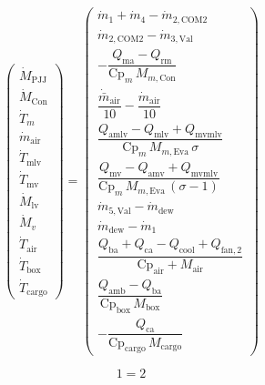 \begin{equation} \renewcommand{\arraystretch}{2.5}
	\left(\begin{array}{c}
		{\dot{M} }_{\textrm{PJJ}} \\
		{\dot{M} }_{\textrm{Con}} \\
		{\dot{T} }_m \\
		{\dot{m} }_{\textrm{air}} \\
		{\dot{T} }_{\textrm{mlv}} \\
		{\dot{T} }_{\textrm{mv}} \\
		{\dot{M} }_{\textrm{lv}} \\
		{\dot{M} }_v \\
		{\dot{T} }_{\textrm{air}} \\
		{\dot{T} }_{\textrm{box}} \\
		{\dot{T} }_{\textrm{cargo}}
	\end{array}\right)
	=
	\left(\begin{array}{c}
		{\dot{m} }_1 +{\dot{m} }_4 -{\dot{m} }_{2,\textrm{COM2}} \\
		{\dot{m} }_{2,\textrm{COM2}} -{\dot{m} }_{3,\textrm{Val}} \\
		-\dfrac{Q_{\textrm{ma}} -Q_{\textrm{rm}} }{{\textrm{Cp}}_m \,M_{m,\textrm{Con}} }\\
		\dfrac{{\dot{\bar{m} } }_{\textrm{air}} }{10}-\dfrac{{\dot{m} }_{\textrm{air}} }{10}\\
		\dfrac{Q_{\textrm{amlv}} -Q_{\textrm{mlv}} +Q_{\textrm{mvmlv}} }{{\textrm{Cp}}_m \,M_{m,\textrm{Eva}} \,\sigma }\\
		\dfrac{Q_{\textrm{mv}} -Q_{\textrm{amv}} +Q_{\textrm{mvmlv}} }{{\textrm{Cp}}_m \,M_{m,\textrm{Eva}} \,{\left(\sigma -1\right)}}\\
		{\dot{m} }_{5,\textrm{Val}} -{\dot{m} }_{\textrm{dew}} \\
		{\dot{m} }_{\textrm{dew}} -{\dot{m} }_1 \\
		\dfrac{Q_{\textrm{ba}} +Q_{\textrm{ca}} -Q_{\textrm{cool}} +Q_{\textrm{fan},2} }{{\textrm{Cp}}_{\textrm{air}} +M_{\textrm{air}} }\\
		\dfrac{Q_{\textrm{amb}} -Q_{\textrm{ba}} }{{\textrm{Cp}}_{\textrm{box}} \,M_{\textrm{box}} }\\
		-\dfrac{Q_{\textrm{ca}} }{{\textrm{Cp}}_{\textrm{cargo}} \,M_{\textrm{cargo}} }
	\end{array}\right)
\end{equation}







\begin{equation} \renewcommand{\arraystretch}{2.5}
	1
	=
	2
\end{equation}